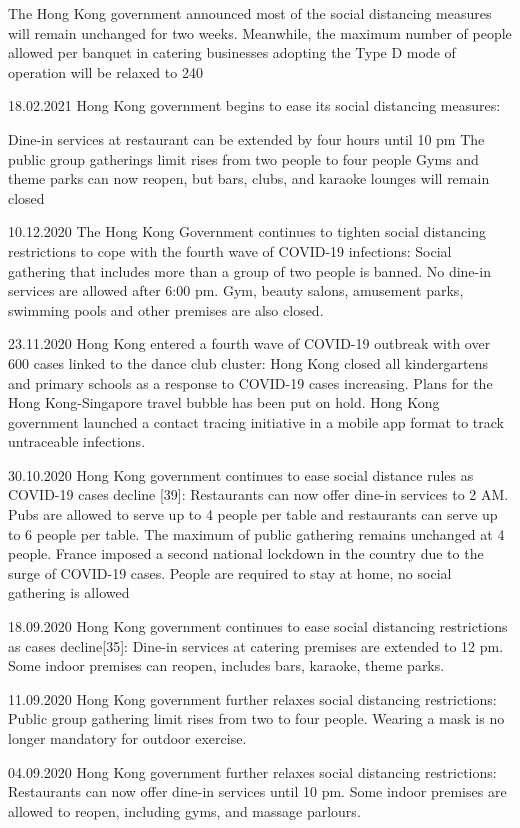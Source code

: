 The Hong Kong government announced most of the social distancing measures will remain unchanged for two weeks. Meanwhile, the maximum number of people allowed per banquet in catering businesses adopting the Type D mode of operation will be relaxed to 240

18.02.2021 Hong Kong government begins to ease its social distancing measures:

Dine-in services at restaurant can be extended by four hours until 10 pm
The public group gatherings limit rises from two people to four people
Gyms and theme parks can now reopen, but bars, clubs, and karaoke lounges will remain closed

10.12.2020 The Hong Kong Government continues to tighten social distancing restrictions to cope with the fourth wave of COVID-19 infections:
Social gathering that includes more than a group of two people is banned.
No dine-in services are allowed after 6:00 pm.
Gym, beauty salons, amusement parks, swimming pools and other premises are also closed.

23.11.2020 Hong Kong entered a fourth wave of COVID-19 outbreak with over 600 cases linked to the dance club cluster:
Hong Kong closed all kindergartens and primary schools as a response to COVID-19 cases increasing.
Plans for the Hong Kong-Singapore travel bubble has been put on hold.
Hong Kong government launched a contact tracing initiative in a mobile app format to track untraceable infections.

30.10.2020 Hong Kong government continues to ease social distance rules as COVID-19 cases decline [39]:
Restaurants can now offer dine-in services to 2 AM.
Pubs are allowed to serve up to 4 people per table and restaurants can serve up to 6 people per table.
The maximum of public gathering remains unchanged at 4 people.
France imposed a second national lockdown in the country due to the surge of COVID-19 cases. People are required to stay at home, no social gathering is allowed

18.09.2020 Hong Kong government continues to ease social distancing restrictions as cases decline[35]:
Dine-in services at catering premises are extended to 12 pm.
Some indoor premises can reopen, includes bars, karaoke, theme parks.

11.09.2020 Hong Kong government further relaxes social distancing restrictions:
Public group gathering limit rises from two to four people.
Wearing a mask is no longer mandatory for outdoor exercise.

04.09.2020 Hong Kong government further relaxes social distancing restrictions:
Restaurants can now offer dine-in services until 10 pm.
Some indoor premises are allowed to reopen, including gyms, and massage parlours.

